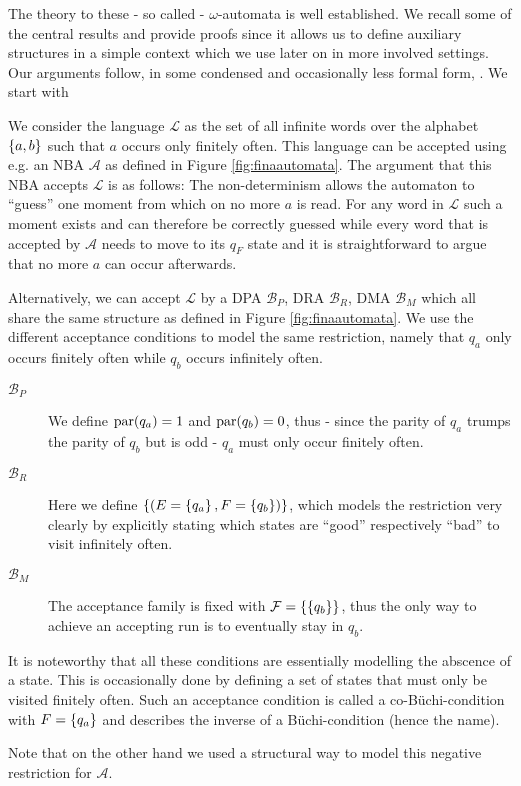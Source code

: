 The theory to these - so called - $\omega$-automata is well
established. We recall some of the central results and provide proofs since it
allows us to define auxiliary structures in a simple context which we use later
on in more involved settings. Our arguments follow, in some condensed and
occasionally less formal form, \cite[Chapter 1]{AutoLogInfGames}. We start with
\begin{example}
  We consider the language $\mathcal{L}$ as the set of all infinite
  words over the alphabet $\left\{a,b\right\}$ such that $a$ occurs only finitely often.
  This language can be accepted using e.g. an \ac{NBA} $\mathcal{A}$ as defined 
  in Figure \ref{fig:finaautomata}. The argument that this \ac{NBA} accepts 
  $\mathcal{L}$ is as follows: The non-determinism allows the automaton to 
  \enquote{guess} one moment from which on no more $a$ is read. For any word in 
  $\mathcal{L}$ such a moment exists and can therefore be correctly guessed 
  while every word that is accepted by $\mathcal{A}$ needs to move to its
  $q_{F}$ state and it is straightforward to argue that no more $a$ can occur
  afterwards.

  Alternatively, we can accept $\mathcal{L}$ by a \ac{DPA} $\mathcal{B}_{P}$,
  \ac{DRA} $\mathcal{B}_{R}$, \ac{DMA}
  $\mathcal{B}_{M}$ which all share the same structure as defined in Figure
  \ref{fig:finaautomata}. We use the different acceptance conditions to model
  the same restriction, namely that $q_{a}$ only occurs finitely often while
  $q_{b}$ occurs infinitely often.
  \begin{description}
    \item [$\mathcal{B}_{P}$] We define $\operatorname{par}(q_{a}) = 1$ and
      $\operatorname{par}(q_{b}) = 0$, thus - since the parity of $q_{a}$ trumps the
      parity of $q_{b}$ but is odd - $q_{a}$ must only occur finitely often.
    \item [$\mathcal{B}_{R}$] Here we define $\left\{\left(E = \left\{q_{a}\right\},
      F = \left\{q_{b}\right\}\right)\right\}$, which models the restriction very clearly by
      explicitly stating which states are \enquote{good} respectively
      \enquote{bad} to visit infinitely often.
    \item [$\mathcal{B}_{M}$] The acceptance family is fixed with
      $\mathcal{F} = \left\{\left\{q_{b}\right\}\right\}$, thus the only way to achieve an
      accepting run is to eventually stay in $q_{b}$.
  \end{description}
  It is noteworthy that all these conditions are essentially modelling the
  abscence of a state. This is occasionally done by defining a set of states
  that must only be visited finitely often. Such an acceptance condition is
  called a co-Büchi-condition with $F = \left\{q_{a}\right\}$ and describes the inverse
  of a Büchi-condition (hence the name).
 
  Note that on the other hand we used a structural way to model this negative
  restriction for $\mathcal{A}$.
  \label{ex:fina}
\end{example}
